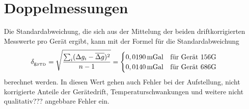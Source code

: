 \section{Doppelmessungen}

Die Standardabweichung, die sich aus der Mittelung der beiden driftkorrigierten Messwerte pro Gerät ergibt, kann mit der Formel für die Standardabweichung
\begin{equation}
 \delta_{\mathrm{g_{\mathrm{STD}}}}=\sqrt{\frac{\sum_i (\Delta g_i - \overline{\Delta g})^2}{n-1}}
 =\begin{cases}
   0,0190\,\mathrm{mGal} \quad \text{für Gerät 156G}\\
     0,0140\,\mathrm{mGal} \quad \text{für Gerät 686G}
  \end{cases}
\end{equation}
berechnet werden. In diesen Wert gehen auch Fehler bei der Aufstellung, nicht korrigierte Anteile der Gerätedrift, Temperaturschwankungen und weitere nicht qualitativ??? angebbare Fehler ein.